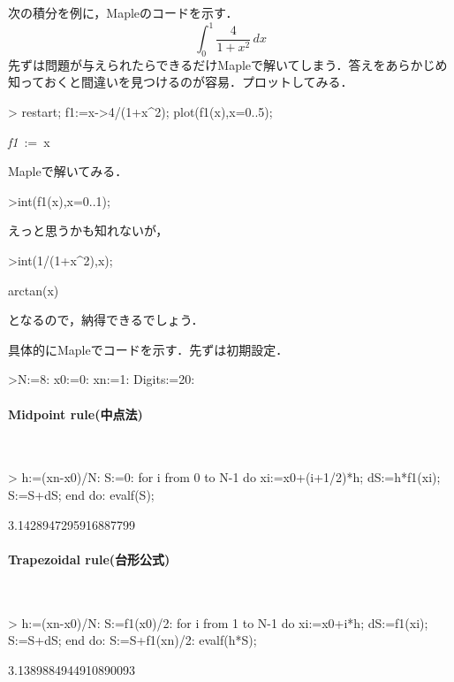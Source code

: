 次の積分を例に，Mapleのコードを示す．
\begin{equation*}
\int_0^1 \frac{4}{1+x^2} \, dx
\end{equation*}
先ずは問題が与えられたらできるだけMapleで解いてしまう．答えをあらかじめ知っておくと間違いを見つけるのが容易．プロットしてみる．
\begin{MapleInput}
> restart; 
  f1:=x->4/(1+x^2); 
  plot(f1(x),x=0..5);
\end{MapleInput}
\begin{MapleOutput}
{\it f1}\, := \,x\mapsto {}
\end{MapleOutput}
Mapleで解いてみる．
\begin{MapleInput}
>int(f1(x),x=0..1);
\end{MapleInput}
\begin{MapleOutput}
\pi
\end{MapleOutput}
えっと思うかも知れないが，
\begin{MapleInput}
>int(1/(1+x^2),x);
\end{MapleInput}
\begin{MapleOutput}
arctan(x)
\end{MapleOutput}
となるので，納得できるでしょう．

具体的にMapleでコードを示す．先ずは初期設定．
\begin{MapleInput}
>N:=8: x0:=0: xn:=1: Digits:=20:
\end{MapleInput}

\paragraph{Midpoint rule(中点法)}　
\begin{MapleInput}
> h:=(xn-x0)/N: S:=0: 
  for i from 0 to N-1 do 
    xi:=x0+(i+1/2)*h; 
    dS:=h*f1(xi);
    S:=S+dS; 
  end do: 
  evalf(S);
\end{MapleInput}
\begin{MapleOutput}
3.1428947295916887799
\end{MapleOutput}

\paragraph{Trapezoidal rule(台形公式)}　
\begin{MapleInput}
> h:=(xn-x0)/N: S:=f1(x0)/2: 
  for i from 1 to N-1 do 
    xi:=x0+i*h; 
    dS:=f1(xi);
    S:=S+dS; 
  end do: 
  S:=S+f1(xn)/2: 
  evalf(h*S);
\end{MapleInput}
\begin{MapleOutput}
3.1389884944910890093
\end{MapleOutput}


